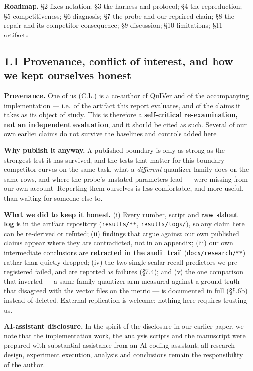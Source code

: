 \documentclass[
  10pt,
]{article}
\begin{document}
\textbf{Roadmap.} §2 fixes notation; §3 the harness and protocol; §4 the
reproduction; §5 competitiveness; §6 diagnosis; §7 the probe and our
repaired chain; §8 the repair and its competitor consequence; §9
discussion; §10 limitations; §11 artifacts.

\subsection{1.1 Provenance, conflict of interest, and how we kept
ourselves
honest}\label{provenance-conflict-of-interest-and-how-we-kept-ourselves-honest}

\textbf{Provenance.} One of us (C.L.) is a co-author of QuIVer and of
the accompanying implementation --- i.e.~of the artifact this report
evaluates, and of the claims it takes as its object of study. This is
therefore a \textbf{self-critical re-examination, not an independent
evaluation}, and it should be cited as such. Several of our own earlier
claims do not survive the baselines and controls added here.

\textbf{Why publish it anyway.} A published boundary is only as strong
as the strongest test it has survived, and the tests that matter for
this boundary --- competitor curves on the same task, what a
\emph{different} quantizer family does on the same rows, and where the
probe's unstated parameters lead --- were missing from our own account.
Reporting them ourselves is less comfortable, and more useful, than
waiting for someone else to.

\textbf{What we did to keep it honest.} (i) Every number, script and
\textbf{raw stdout log} is in the artifact repository
(\texttt{results/**}, \texttt{results/logs/}), so any claim here can be
re-derived or refuted; (ii) findings that argue against our own
published claims appear where they are contradicted, not in an appendix;
(iii) our own intermediate conclusions are \textbf{retracted in the
audit trail} (\texttt{docs/research/**}) rather than quietly dropped;
(iv) the two single-scalar recall predictors we pre-registered failed,
and are reported as failures (§7.4); and (v) the one comparison that
inverted --- a same-family quantizer arm measured against a ground truth
that disagreed with the vector files on the metric --- is documented in
full (§5.6b) instead of deleted. External replication is welcome;
nothing here requires trusting us.

\textbf{AI-assistant disclosure.} In the spirit of the disclosure in our
earlier paper, we note that the implementation work, the analysis
scripts and the manuscript were prepared with substantial assistance
from an AI coding assistant; all research design, experiment execution,
analysis and conclusions remain the responsibility of the author.
\end{document}
